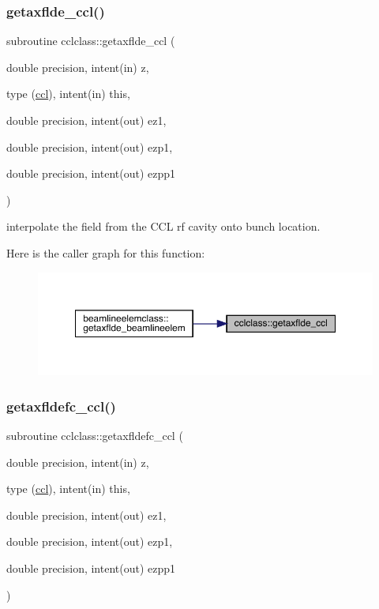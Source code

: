 \mbox{\label{namespacecclclass_a881db4a51cdc73a6c489b2814565a243}} 
\subsubsection{\texorpdfstring{getaxflde\_ccl()}{getaxflde\_ccl()}}
{\footnotesize\ttfamily subroutine cclclass\+::getaxflde\+\_\+ccl (\begin{DoxyParamCaption}\item[{double precision, intent(in)}]{z,  }\item[{type (\mbox{\hyperlink{namespacecclclass_structcclclass_1_1ccl}{ccl}}), intent(in)}]{this,  }\item[{double precision, intent(out)}]{ez1,  }\item[{double precision, intent(out)}]{ezp1,  }\item[{double precision, intent(out)}]{ezpp1 }\end{DoxyParamCaption})}



interpolate the field from the C\+CL rf cavity onto bunch location. 

Here is the caller graph for this function\+:\nopagebreak
\begin{figure}[H]
\begin{center}
\leavevmode
\includegraphics[width=350pt]{namespacecclclass_a881db4a51cdc73a6c489b2814565a243_icgraph}
\end{center}
\end{figure}
\mbox{\label{namespacecclclass_a06d52f7ecb50e977ef5e2330506180d2}} 
\subsubsection{\texorpdfstring{getaxfldefc\_ccl()}{getaxfldefc\_ccl()}}
{\footnotesize\ttfamily subroutine cclclass\+::getaxfldefc\+\_\+ccl (\begin{DoxyParamCaption}\item[{double precision, intent(in)}]{z,  }\item[{type (\mbox{\hyperlink{namespacecclclass_structcclclass_1_1ccl}{ccl}}), intent(in)}]{this,  }\item[{double precision, intent(out)}]{ez1,  }\item[{double precision, intent(out)}]{ezp1,  }\item[{double precision, intent(out)}]{ezpp1 }\end{DoxyParamCaption})}



